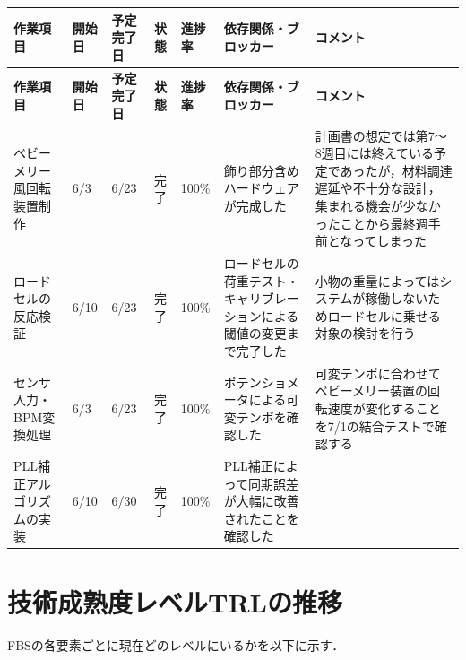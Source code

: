 \documentclass[a4paper,12pt]{ltjsarticle}
\begin{document}
\begin{longtable}{C{2cm}C{1.6cm}C{1.6cm}C{2.2cm}C{1.2cm}L{2.4cm}L{3cm}}
  \toprule
  \textbf{作業項目} & \textbf{開始日} & \textbf{予定完了日} & \textbf{状態} & \textbf{進捗率} & \textbf{依存関係・ブロッカー} & \textbf{コメント} \\
  \midrule
  \endfirsthead
  \toprule
  \textbf{作業項目} & \textbf{開始日} & \textbf{予定完了日} & \textbf{状態} & \textbf{進捗率} & \textbf{依存関係・ブロッカー} & \textbf{コメント} \\
  \midrule
  \endhead
  \midrule
  \endfoot
  \bottomrule
  \endlastfoot
  ベビーメリー風回転装置制作 & 6/3 & 6/23 & 完了 & 100\% & 飾り部分含めハードウェアが完成した & 計画書の想定では第7〜8週目には終えている予定であったが，材料調達遅延や不十分な設計，集まれる機会が少なかったことから最終週手前となってしまった \\
  ロードセルの反応検証 & 6/10 & 6/23 & 完了 & 100\% & ロードセルの荷重テスト・キャリブレーションによる閾値の変更まで完了した & 小物の重量によってはシステムが稼働しないためロードセルに乗せる対象の検討を行う \\
  センサ入力・BPM変換処理 & 6/3 & 6/23 & 完了 & 100\% & ポテンショメータによる可変テンポを確認した & 可変テンポに合わせてベビーメリー装置の回転速度が変化することを7/1の結合テストで確認する \\
  PLL補正アルゴリズムの実装 & 6/10 & 6/30 & 完了 & 100\% & PLL補正によって同期誤差が大幅に改善されたことを確認した & 
\end{longtable}

\section{技術成熟度レベルTRLの推移}
FBSの各要素ごとに現在どのレベルにいるかを以下に示す．
\end{document}

